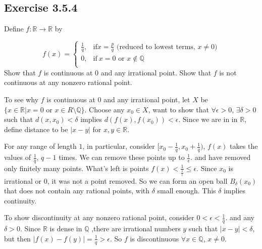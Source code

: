 \documentclass{tufte-book}
\theoremstyle{mytheoremstyle}
\theoremstyle{mylemstyle}
\theoremstyle{mydefstyle}
\begin{document}
\subsection{Exercise 3.5.4}
Define $f: \mathbb{R} \rightarrow \mathbb{R}$ by 

\[f(x) = 
\begin{cases}
      \frac{1}{q},  & \text{if} x = \frac{p}{q} \text{ (reduced to lowest terms,  } x \neq 0 \text{)} \\
      0, & \text{if}\ x = 0 \text{ or } x \not\in \mathbb{Q}\\
\end{cases}
\]
Show that $f$ is continuous at $0$ and any irrational point.  Show that $f$ is not continuous at any nonzero rational point.

To see why $f$ is continuous at $0$ and any irrational point, let $X$ be $\{x \in \mathbb{R} | x =0 \text{ or } x \in R \setminus \mathbb{Q}\}$.  Choose any $x_0 \in X$, want to show that $\forall \epsilon >0$, $\exists \delta > 0$ such that $d(x, x_0) < \delta$ implies $d(f(x), f(x_0)) < \epsilon$.  Since we are in in $\mathbb{R}$, define distance to be $|x - y|$ for $x, y \in \mathbb{R}$.

For any range of length $1$, in particular, consider $[x_0-\frac{1}{q}, x_0+\frac{1}{q})$, $f(x)$ takes the values of $\frac{1}{q}$, $q -1$ times.  We can remove these points up to $\frac{1}{\epsilon}$. and have removed only finitely many points.  What's left is points $f(x) < \frac{1}{\frac{1}{\epsilon}} \leq \epsilon$.  Since $x_0$ is irrational or $0$, it was not a point removed.  So we can form an open ball $B_\delta(x_0)$ that does not contain any rational points, with $\delta$ small enough.  This $\delta$ implies continuity.

To show discontinuity at any nonzero rational point, consider $0 < \epsilon < \frac{1}{q}$.  and any $\delta > 0$.  Since $\mathbb{R}$ is dense in $\mathbb{Q}$ ,there are irrational numbers $y$ such that $|x-y| < \delta$, but then $|f(x) - f(y)| = \frac{1}{q} > \epsilon$.  So $f$ is discontinuous $\forall x \in \mathbb{Q}$, $x \neq 0$.
\end{document}
